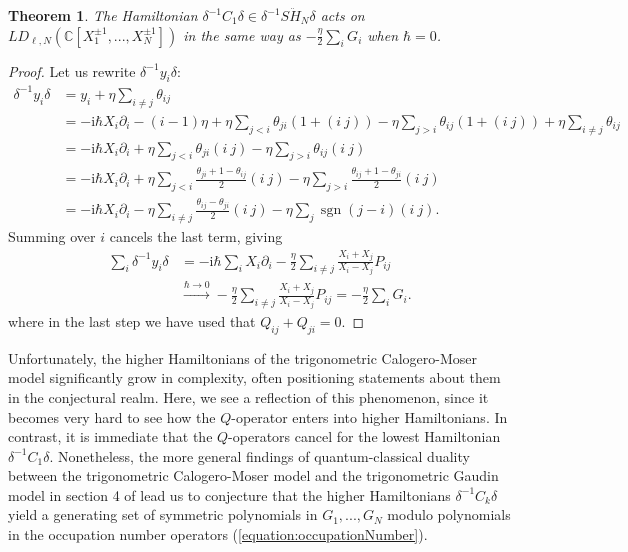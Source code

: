 \documentclass[11pt]{report}
\newtheorem{theorem}{Theorem}[section]
\theoremstyle{definition}
\theoremstyle{remark}
\theoremstyle{remark}
\newcommand{\C}{\mathbb{C}}
\newcommand{\I}{\mathrm{i}}
\begin{document}
\begin{theorem}
The Hamiltonian $\delta^{-1} C_1 \delta \in \delta^{-1} S\ddot H_N \delta$ acts on $LD_{\ell,N}(\C[X_1^{\pm 1},...,X_N^{\pm 1}])$ in the same way as $-\frac{\eta}{2} \sum_i G_i$ when $\hbar = 0$.
\end{theorem}

\begin{proof}
Let us rewrite $\delta^{-1} y_i \delta$:
\begin{align*}
\delta^{-1} y_i \delta
&= y_i + \eta \sum_{i \neq j} \theta_{ij} \\
&= -\I \hbar X_i \partial_i - (i-1) \eta + \eta \sum_{j < i} \theta_{ji} (1+(i \ j)) - \eta \sum_{j > i} \theta_{ij} (1+(i \ j)) + \eta \sum_{i \neq j} \theta_{ij} \\
&= -\I \hbar X_i \partial_i + \eta \sum_{j < i} \theta_{ji} (i \ j) - \eta \sum_{j > i} \theta_{ij} (i \ j) \\
&= -\I \hbar X_i \partial_i + \eta \sum_{j < i} \frac{\theta_{ji}+1-\theta_{ij}}{2} (i \ j) - \eta \sum_{j > i} \frac{\theta_{ij}+1-\theta_{ji}}{2} (i \ j) \\
&= -\I \hbar X_i \partial_i - \eta \sum_{i \neq j} \frac{\theta_{ij}-\theta_{ji}}{2} (i \ j) - \eta \sum_j \operatorname{sgn}(j-i) (i \ j).
\end{align*}
Summing over $i$ cancels the last term, giving
\begin{align*}
\sum_i \delta^{-1} y_i \delta
&= -\I\hbar \sum_i X_i \partial_i - \frac{\eta}{2} \sum_{i \neq j} \frac{X_i+X_j}{X_i-X_j} P_{ij} \\
&\overset{\hbar \to 0}\longrightarrow - \frac{\eta}{2} \sum_{i \neq j} \frac{X_i+X_j}{X_i-X_j} P_{ij} = -\frac{\eta}{2} \sum_i G_i.
\end{align*}
where in the last step we have used that $Q_{ij} + Q_{ji} = 0$.
\end{proof}

Unfortunately, the higher Hamiltonians of the trigonometric Calogero-Moser model significantly grow in complexity, often positioning statements about them in the conjectural realm. Here, we see a reflection of this phenomenon, since it becomes very hard to see how the $Q$-operator enters into higher Hamiltonians. In contrast, it is immediate that the $Q$-operators cancel for the lowest Hamiltonian $\delta^{-1} C_1 \delta$. Nonetheless, the more general findings of quantum-classical duality between the trigonometric Calogero-Moser model and the trigonometric Gaudin model in section 4 of \cite{article:zabrodin:2017} lead us to conjecture that the higher Hamiltonians $\delta^{-1} C_k \delta$ yield a generating set of symmetric polynomials in $G_1,...,G_N$ modulo polynomials in the occupation number operators (\ref{equation:occupationNumber}).
\end{document}
